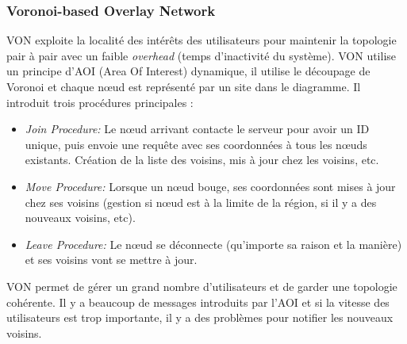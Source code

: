 		\subsubsection{Voronoi-based Overlay Network}
		 	VON exploite la localité des intérêts des utilisateurs pour maintenir la topologie pair à pair avec un faible \textit{overhead} (temps d'inactivité du système). VON utilise un principe d'AOI (Area Of Interest) dynamique, il utilise le découpage de Voronoi et chaque nœud est représenté par un site dans le diagramme. Il introduit trois procédures principales :
		\begin{itemize}
	        \renewcommand{\labelitemi}{$\bullet$}
                	\item \textit{Join Procedure:} Le nœud arrivant contacte le serveur pour avoir un ID unique, puis envoie une requête avec ses coordonnées à tous les nœuds existants. Création de la liste des voisins, mis à jour chez les voisins, etc.
                	\item \textit{Move Procedure:} Lorsque un nœud bouge, ses coordonnées sont mises à jour chez ses voisins (gestion si nœud est à la limite de la région, si il y a des nouveaux voisins, etc).
                	\item \textit{Leave Procedure:} Le nœud se déconnecte (qu'importe sa raison et la manière) et ses voisins vont se mettre à jour.
        	\end{itemize}
        	VON permet de gérer un grand nombre d'utilisateurs et de garder une topologie cohérente. Il y a beaucoup de messages introduits par l'AOI et si la vitesse des utilisateurs est trop importante, il y a des problèmes pour notifier les nouveaux voisins.

		

	
